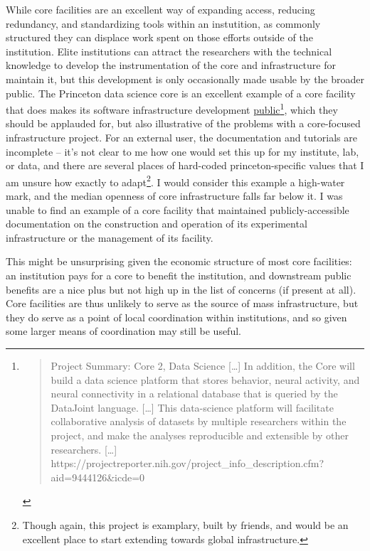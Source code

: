 \documentclass[10pt]{article}
\begin{document}
\begin{multicols}{2}
While core facilities are an excellent way of expanding access, reducing
redundancy, and standardizing tools within an instutition, as commonly
structured they can displace work spent on those efforts outside of the
institution. Elite institutions can attract the researchers with the
technical knowledge to develop the instrumentation of the core and
infrastructure for maintain it, but this development is only
occasionally made usable by the broader public. The Princeton data
science core is an excellent example of a core facility that does makes
its software infrastructure development
\href{https://github.com/BrainCOGS}{public}\footnote{\begin{quote}
  Project Summary: Core 2, Data Science {[}\ldots{]} In addition, the
  Core will build a data science platform that stores behavior, neural
  activity, and neural connectivity in a relational database that is
  queried by the DataJoint language. {[}\ldots{]} This data-science
  platform will facilitate collaborative analysis of datasets by
  multiple researchers within the project, and make the analyses
  reproducible and extensible by other researchers. {[}\ldots{]}
  https://projectreporter.nih.gov/project\_info\_description.cfm?aid=9444126\&icde=0
  \end{quote}}, which they should be applauded for, but also
illustrative of the problems with a core-focused infrastructure project.
For an external user, the documentation and tutorials are incomplete --
it's not clear to me how one would set this up for my institute, lab, or
data, and there are several places of hard-coded princeton-specific
values that I am unsure how exactly to adapt\footnote{Though again, this
  project is examplary, built by friends, and would be an excellent
  place to start extending towards global infrastructure.}. I would
consider this example a high-water mark, and the median openness of core
infrastructure falls far below it. I was unable to find an example of a
core facility that maintained publicly-accessible documentation on the
construction and operation of its experimental infrastructure or the
management of its facility.

This might be unsurprising given the economic structure of most core
facilities: an institution pays for a core to benefit the institution,
and downstream public benefits are a nice plus but not high up in the
list of concerns (if present at all). Core facilities are thus unlikely
to serve as the source of mass infrastructure, but they do serve as a
point of local coordination within institutions, and so given some
larger means of coordination may still be useful.


\end{multicols}
\end{document}
